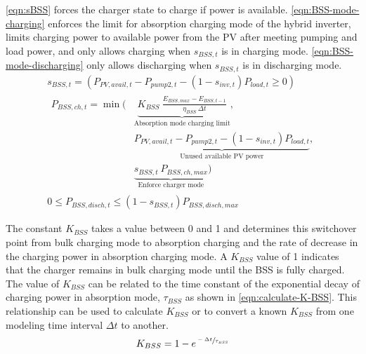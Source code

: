 \autoref{eqn:sBSS} forces the charger state to charge if power is available.
\autoref{eqn:BSS-mode-charging} enforces the limit for absorption charging mode of the hybrid inverter,
limits charging power to available power from the PV after meeting pumping and load power,
and only allows charging when $s_{BSS,t}$ is in charging mode.
\autoref{eqn:BSS-mode-discharging} only allows discharging when $s_{BSS,t}$ is in discharging mode.
%
\begin{gather}
\label{eqn:sBSS}
s_{BSS,t} = \left( P_{PV,avail,t} - P_{pump2,t} - (1 - s_{inv,t}) P_{load,t} \ge 0 \right)
\\
\label{eqn:BSS-mode-charging}
\begin{aligned}
P_{BSS,ch,t} = \min\Big(
& \underbrace{K_{BSS} \ \frac{E_{BSS,max} - E_{BSS,t-1}}{\eta_{BSS} \ \Delta t}}_
{\textrm{Absorption mode charging limit}},
\\
& \underbrace{P_{PV,avail,t} - P_{pump2,t} - (1 - s_{inv,t}) P_{load,t}}_
{\textrm{Unused available PV power}},
\\
& \underbrace{s_{BSS,t} \ P_{BSS,ch,max}}_  
{\textrm{Enforce charger mode}} \Big)
\end{aligned}
\\
\label{eqn:BSS-mode-discharging}
0 \le P_{BSS,disch,t} \le \left(1 - s_{BSS,t}\right) P_{BSS,disch,max}
\end{gather}

The constant $K_{BSS}$ takes a value between 0 and 1 and determines this switchover point from bulk charging mode to absorption charging and the rate of decrease in the charging power in absorption charging mode. A $K_{BSS}$ value of 1 indicates that the charger remains in bulk charging mode until the BSS is fully charged. The value of $K_{BSS}$ can be related to the time constant of the exponential decay of charging power in absorption mode, $\tau_{BSS}$ as shown in \autoref{eqn:calculate-K-BSS}. This relationship can be used to calculate $K_{BSS}$ or to convert a known $K_{BSS}$ from one modeling time interval $\Delta t$ to another.
%
\begin{equation}
\label{eqn:calculate-K-BSS}
K_{BSS} = 1 - e^{\sfrac{-\Delta t}{\tau_{BSS}}}
\end{equation}

